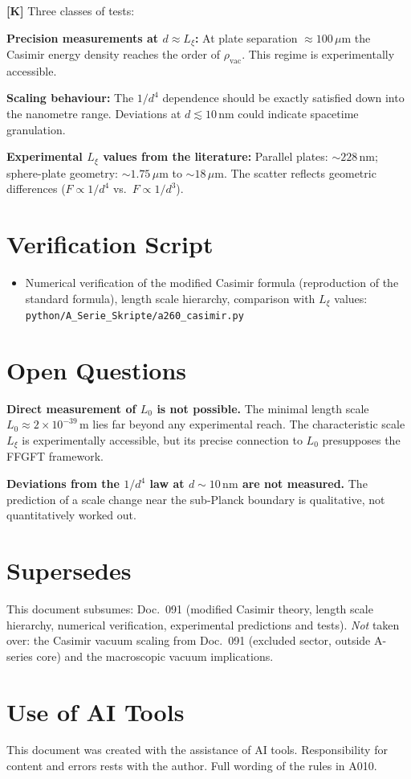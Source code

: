 \textbf{[K]} Three classes of tests:

\textbf{Precision measurements at $d\approx L_\xi$:} At plate separation
$\approx100\,\mu$m the Casimir energy density reaches the order of $\rho_\text{vac}$.
This regime is experimentally accessible.

\textbf{Scaling behaviour:} The $1/d^4$ dependence should be exactly satisfied
down into the nanometre range. Deviations at $d\lesssim10\,\text{nm}$ could
indicate spacetime granulation.

\textbf{Experimental $L_\xi$ values from the literature:} Parallel plates:
$\sim228\,\text{nm}$; sphere-plate geometry: $\sim1{.}75\,\mu\text{m}$ to
$\sim18\,\mu\text{m}$. The scatter reflects geometric differences
($F\propto1/d^4$ vs.\ $F\propto1/d^3$).

\section{Verification Script}

\begin{itemize}[leftmargin=2em,itemsep=2pt,topsep=2pt]
  \item Numerical verification of the modified Casimir formula (reproduction of
    the standard formula), length scale hierarchy, comparison with $L_\xi$ values:
    \texttt{python/A\_Serie\_Skripte/a260\_casimir.py}
\end{itemize}

\section{Open Questions}

\textbf{Direct measurement of $L_0$ is not possible.} The minimal length scale
$L_0\approx2\times10^{-39}\,\text{m}$ lies far beyond any experimental reach.
The characteristic scale $L_\xi$ is experimentally accessible, but its precise
connection to $L_0$ presupposes the FFGFT framework.

\textbf{Deviations from the $1/d^4$ law at $d\sim10\,\text{nm}$ are not measured.}
The prediction of a scale change near the sub-Planck boundary is qualitative,
not quantitatively worked out.

\section{Supersedes}

This document subsumes: Doc.~091 (modified Casimir theory, length scale hierarchy,
numerical verification, experimental predictions and tests). \emph{Not} taken over:
the Casimir vacuum scaling from Doc.~091 (excluded sector, outside A-series core)
and the macroscopic vacuum implications.

\section{Use of AI Tools}

This document was created with the assistance of AI tools. Responsibility
for content and errors rests with the author. Full wording of the rules in A010.
